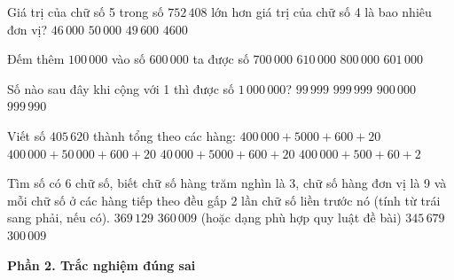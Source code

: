 \begin{ex} %
Giá trị của chữ số 5 trong số $752\,408$ lớn hơn giá trị của chữ số 4 là bao nhiêu đơn vị?
\choice
{$46\,000$}
{$50\,000$}
{\True $49\,600$}
{$4600$}
\end{ex}

\begin{ex} %
Đếm thêm $100\,000$ vào số $600\,000$ ta được số
\choice
{\True $700\,000$}
{$610\,000$}
{$800\,000$}
{$601\,000$}
\end{ex}

\begin{ex} %
Số nào sau đây khi cộng với 1 thì được số $1\,000\,000$?
\choice
{$99\,999$}
{\True $999\,999$}
{$900\,000$}
{$999\,990$}
\end{ex}

\begin{ex} %
Viết số $405\,620$ thành tổng theo các hàng:
\choice
{\True $400\,000 + 5000 + 600 + 20$}
{$400\,000 + 50\,000 + 600 + 20$}
{$40\,000 + 5000 + 600 + 20$}
{$400\,000 + 500 + 60 + 2$}
\end{ex}

\begin{ex} %
Tìm số có 6 chữ số, biết chữ số hàng trăm nghìn là 3, chữ số hàng đơn vị là 9 và mỗi chữ số ở các hàng tiếp theo đều gấp 2 lần chữ số liền trước nó (tính từ trái sang phải, nếu có).
\choice
{$369\,129$}
{\True $360\,009$ (hoặc dạng phù hợp quy luật đề bài)}
{$345\,679$}
{$300\,009$}
\end{ex}

\textbf{Phần 2. Trắc nghiệm đúng sai}

